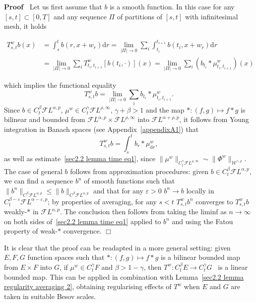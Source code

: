 \documentclass[10pt]{article}
\newcommand{\mathd}{\mathrm{d}}
\newenvironment{proof}{\noindent\textbf{Proof\ }}{\hspace*{\fill}$\Box$\medskip}
\begin{document}
\begin{proof}
  Let us first assume that $b$ is a smooth function. In this case for any $[s,
  t] \subset [0, T]$ and any sequence $\Pi$ of partitions of $[s, t]$ with
  infinitesimal mesh, it holds
  
  \begin{align*}
    T^w_{s, t} b (x) & = \int_s^t b (r, x + w_r) \mathd r = \lim_{| \Pi |
    \rightarrow 0} \sum_i \int_{t_i}^{t_{i + 1}} b (t_i, x + w_r) \mathd r\\
    & = \lim_{| \Pi | \rightarrow 0} \sum_i T^w_{t_i, t_{i + 1}} [b (t_i,
    \cdot)] (x) = \lim_{| \Pi | \rightarrow 0} \sum_i (b_{t_i} \ast
    \mu^w_{t_i, t_{i + 1}}) (x)
  \end{align*}
  
  which implies the functional equality
  \[ T^w_{s, t} b = \lim_{| \Pi | \rightarrow 0} \sum_i b_{t_i} \ast
     \mu^w_{t_i, t_{i + 1}} . \]
  Since $b \in C^{\beta}_t \mathcal{F} L^{\alpha, p}$, $\mu^w \in C^{\gamma}_t
  \mathcal{F} L^{\rho, \infty}$, $\gamma + \beta > 1$ and the map $\ast : (f,
  g) \mapsto f \ast g$ is bilinear and bounded from $\mathcal{F} L^{\alpha, p}
  \times \mathcal{F} L^{\rho, \infty}$ into $\mathcal{F} L^{\alpha + \rho,
  p}$, it follows from Young integration in Banach spaces (see
  Appendix~\ref{appendixA1}) that
  \[ T^w_{s, t} b = \int_s^t b_r \ast \mu^w_{\mathd r}, \]
  as well as estimate~{\eqref{sec2.2 lemma time eq1}}, since $\| \mu^w
  \|_{C^{\gamma}_t \mathcal{F} L^{\rho, \infty}} \sim \| \Phi^w
  \|_{\mathcal{W}^{\gamma, \rho}}$. The case of general $b$ follows from
  approximation procedures: given $b \in C^{\beta}_t \mathcal{F} L^{\alpha,
  p}$, we can find a sequence $b^n$ of smooth functions such that $\| b^n
  \|_{C^{\beta} \mathcal{F} L^{\alpha, p}} \leqslant \| b \|_{C^{\beta}
  \mathcal{F} L^{\alpha, p}}$ and that for any $\varepsilon > 0$ $b^n
  \rightarrow b$ locally in $C^{\beta - \varepsilon}_t \mathcal{F} L^{\alpha -
  \varepsilon, p}$; by properties of averaging, for any $s < t$ $T^w_{s, t}
  b^n$ converges to $T^w_{s, t} b$ weakly\mbox{-}$\ast$ in $\mathcal{F}
  L^{\alpha, p}$. The conclusion then follows from taking the liminf as $n
  \rightarrow \infty$ on both sides of~{\eqref{sec2.2 lemma time eq1}} applied
  to $b^n$ and using the Fatou property of weak\mbox{-}$\ast$ convergence.
\end{proof}

\begin{remark}
  \label{sec2.2 remark averaging time}It is clear that the proof can be
  readapted in a more general setting: given $E, F, G$ function spaces such
  that $\ast : (f, g) \mapsto f \ast g$ is a bilinear bounded map from $E
  \times F$ into $G$, if $\mu^w \in C^{\gamma}_t F$ and $\beta > 1 - \gamma$,
  then $T^w : C^{\beta}_t E \rightarrow C^{\gamma}_t G$ \ is a linear bounded
  map. This can be applied in combination with Lemma~\ref{sec2.2 lemma
  regularity averaging 2}, obtaining regularising effects of $T^w$ when $E$
  and $G$ are taken in suitable Besov scales.
\end{remark}
\end{document}

